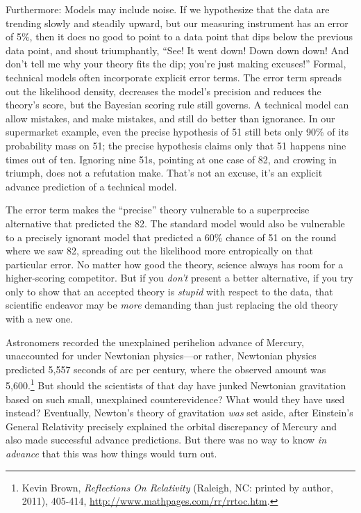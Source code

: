 {
 Furthermore: Models may include noise. If we hypothesize that the
data are trending slowly and steadily upward, but our measuring
instrument has an error of 5\%, then it does no good to point to a data
point that dips below the previous data point, and shout triumphantly,
``See! It went down! Down down down! And
don't tell me why your theory fits the dip;
you're just making excuses!'' Formal,
technical models often incorporate explicit error terms. The error term
spreads out the likelihood density, decreases the
model's precision and reduces the
theory's score, but the Bayesian scoring rule still
governs. A technical model can allow mistakes, and make mistakes, and
still do better than ignorance. In our supermarket example, even the
precise hypothesis of 51 still bets only 90\% of its probability mass
on 51; the precise hypothesis claims only that 51 happens nine times
out of ten. Ignoring nine 51s, pointing at one case of 82, and crowing
in triumph, does not a refutation make. That's not an
excuse, it's an explicit advance prediction of a
technical model.}

{
 The error term makes the
``precise'' theory vulnerable to a
superprecise alternative that predicted the 82. The standard model
would also be vulnerable to a precisely ignorant model that predicted a
60\% chance of 51 on the round where we saw 82, spreading out the
likelihood more entropically on that particular error. No matter how
good the theory, science always has room for a higher-scoring
competitor. But if you \textit{don't} present a better
alternative, if you try only to show that an accepted theory is
\textit{stupid} with respect to the data, that scientific endeavor may
be \textit{more} demanding than just replacing the old theory with a
new one.}

{
 Astronomers recorded the unexplained perihelion advance of
Mercury, unaccounted for under Newtonian physics---or rather, Newtonian
physics predicted 5,557 seconds of arc per century, where the observed
amount was 5,600.\footnote{Kevin Brown, \textit{Reflections On Relativity} (Raleigh, NC:
printed by author, 2011), 405-414,
\url{http://www.mathpages.com/rr/rrtoc.htm}.} But should the scientists of that
day have junked Newtonian gravitation based on such small, unexplained
counterevidence? What would they have used instead? Eventually,
Newton's theory of gravitation \textit{was} set aside,
after Einstein's General Relativity precisely explained
the orbital discrepancy of Mercury and also made successful advance
predictions. But there was no way to know \textit{in advance} that this
was how things would turn out.}

